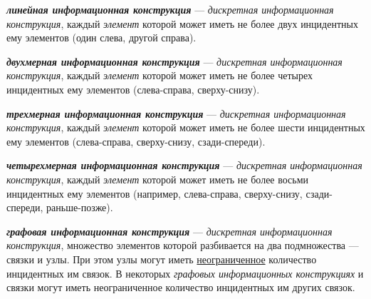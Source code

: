 \begin{SCn}

    \begin{scnindent}
    \end{scnindent}

\end{SCn}

\textit{\textbf{линейная информационная конструкция}} --- \textit{дискретная информационная конструкция}, каждый \textit{элемент} которой может иметь не более двух инцидентных ему элементов (один слева, другой справа).

\textit{\textbf{двухмерная информационная конструкция}} --- \textit{дискретная информационная конструкция}, каждый \textit{элемент} которой может иметь не более четырех инцидентных ему элементов (слева-справа, сверху-снизу).

\textit{\textbf{трехмерная информационная конструкция}} --- \textit{дискретная информационная конструкция}, каждый \textit{элемент} которой может иметь не более шести инцидентных ему элементов (слева-справа, сверху-снизу, сзади-спереди).

\textit{\textbf{четырехмерная информационная конструкция}} --- \textit{дискретная информационная конструкция}, каждый \textit{элемент} которой может иметь не более восьми инцидентных ему элементов (например, слева-справа, сверху-снизу, сзади-спереди, раньше-позже).

\textit{\textbf{графовая информационная конструкция}} --- \textit{дискретная информационная конструкция}, множество элементов которой разбивается на два подмножества --- связки и узлы.
При этом узлы могут иметь \underline{неограниченное} количество инцидентных им связок.
В некоторых \textit{графовых информационных конструкциях} и связки могут иметь неограниченное количество инцидентных им других связок.

